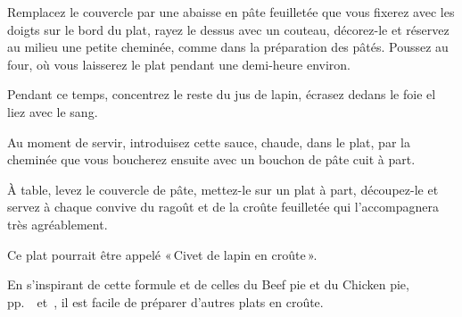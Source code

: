 Remplacez le couvercle par une abaisse en pâte feuilletée que vous fixerez avec
les doigts sur le bord du plat, rayez le dessus avec un couteau, décorez-le et
réservez au milieu une petite cheminée, comme dans la préparation des pâtés.
Poussez au four, où vous laisserez le plat pendant une demi-heure environ.

Pendant ce temps, concentrez le reste du jus de lapin, écrasez dedans le foie
el liez avec le sang.

Au moment de servir, introduisez cette sauce, chaude, dans le plat, par la
cheminée que vous boucherez ensuite avec un bouchon de pâte cuit à part.

À table, levez le couvercle de pâte, mettez-le sur un plat à part, découpez-le
et servez à chaque convive du ragoût et de la croûte feuilletée qui
l'accompagnera très agréablement.

Ce plat pourrait être appelé « Civet de lapin en croûte ».

\sk

En s'inspirant de cette formule et de celles du Beef pie et du Chicken pie,
pp. \hyperlink{p0471}{\pageref{pg0471}} et \hyperlink{p0548}{\pageref {pg0548}}, 
il est facile de préparer d'autres plats en croûte.

\sk
